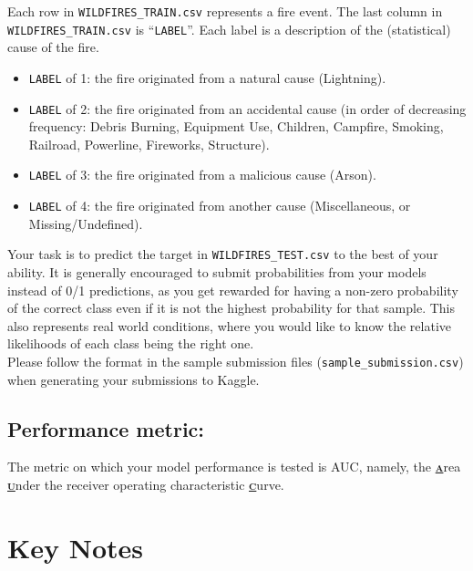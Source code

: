 \noindent Each row in \texttt{WILDFIRES_TRAIN.csv} represents a fire event. The last column in \texttt{WILDFIRES_TRAIN.csv} is ``\texttt{LABEL}''. Each label is a description of the (statistical) cause of the fire. 
\begin{itemize}
\item \texttt{LABEL} of 1: the fire originated from a natural cause (Lightning). 
\item \texttt{LABEL} of 2: the fire originated from an accidental cause (in order of decreasing frequency: Debris Burning, Equipment Use, Children, Campfire, Smoking, Railroad, Powerline, Fireworks, Structure).
\item \texttt{LABEL} of 3: the fire originated from a malicious cause (Arson).
\item \texttt{LABEL} of 4: the fire originated from another cause (Miscellaneous, or Missing/Undefined).
\end{itemize}

\noindent Your task is to predict the target in \texttt{WILDFIRES_TEST.csv} to the best of your ability. It is generally encouraged to submit probabilities from your models instead of 0/1 predictions, as you get rewarded for having a non-zero probability of the correct class even if it is not the highest probability for that sample. This also represents real world conditions, where you would like to know the relative likelihoods of each class being the right one.\\

\noindent Please follow the format in the sample submission files (\texttt{sample_submission.csv}) when generating your submissions to Kaggle.\\


\subsection{Performance metric:}

\noindent The metric on which your model performance is tested is AUC, namely, the \underline{\textbf{\scshape a}}rea \underline{\textbf{\scshape u}}nder the receiver operating characteristic \underline{\textbf{\scshape c}}urve.

\section{Key Notes}

